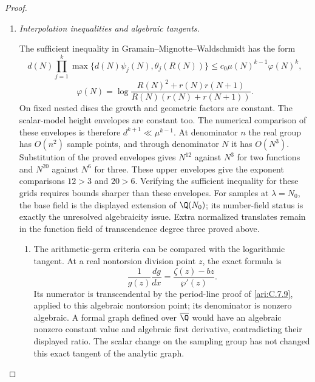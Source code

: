 \begin{proof}
\begin{enumerate}[label=\arabic*.,leftmargin=0pt,labelsep=.5em]
\begin{enumerate}[label=(\alph*),leftmargin=1.3em,labelsep=.5em]
 
\end{enumerate}

\item \emph{Interpolation inequalities and algebraic tangents.}\par
The sufficient inequality in Gramain--Mignotte--Waldschmidt
\citep[Theorem2.1,pp.101--102]{gramain1986values} has the form
\[
 d(N)\prod_{j=1}^k\max\{d(N)\psi_j(N),\theta_j(R(N))\}
 \le c_0\mu(N)^{k-1}\varphi(N)^k,
\]
\[
 \varphi(N)=\log\frac{R(N)^2+r(N)r(N+1)}
                         {R(N)(r(N)+r(N+1))}.
\]
On fixed nested discs the growth and geometric factors are
constant. The scalar-model height envelopes are constant too.
The numerical comparison of these envelopes is therefore
$d^{k+1}\ll\mu^{k-1}$. At denominator $n$ the real group
has $O(n^2)$ sample points, and through denominator $N$ it
has $O(N^3)$. Substitution of the proved envelopes gives
$N^{12}$ against $N^3$ for two functions and $N^{20}$ against
$N^6$ for three. These upper envelopes give the exponent comparisons
$12>3$ and $20>6$. Verifying the sufficient inequality for these grids
requires bounds sharper than these envelopes. For samples at $\lambda=N_0$, the base field is the
displayed extension of $\Q(N_0)$; its number-field status is
exactly the unresolved algebraicity issue. Extra normalized
translates remain in the function field of transcendence degree
three proved above.


\begin{enumerate}[label=(\alph*),leftmargin=1.3em,labelsep=.5em]
\item  The arithmetic-germ criteria
\citep[Theorem~6.1, pp.~31--32]{herblot2012meromorphic}
\citep[Theorem~4.16, author preprint, p.~25]{gasbarri2010analytic}
can be compared with the logarithmic tangent. At a real
nontorsion division point $z$, the exact formula is
\[
 \frac1{g(z)}\frac{dg}{dx}
       =\frac{\zeta(z)-bz}{\wp'(z)}.
\]
Its numerator is transcendental by the period-line proof of
\ref{ari:C.7.9}, applied to this algebraic nontorsion point;
its denominator is nonzero algebraic. A formal graph defined
over $\overline\Q$ would have an algebraic nonzero constant
value and algebraic first derivative, contradicting their
displayed ratio. The scalar change on the sampling group has
not changed this exact tangent of the analytic graph.



\end{enumerate}
\end{enumerate}
\end{proof}
